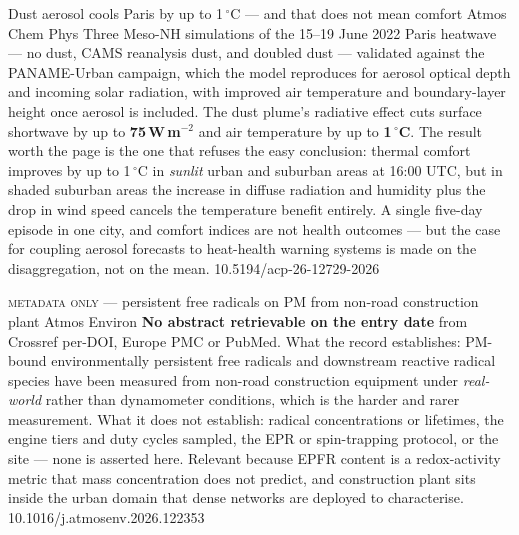 \documentclass[10pt]{article}
\begin{document}
{Dust aerosol cools Paris by up to 1\,$^{\circ}$C --- and that does not mean comfort}
{Atmos Chem Phys}
{Three Meso-NH simulations of the 15--19 June 2022 Paris heatwave --- no dust, CAMS
reanalysis dust, and doubled dust --- validated against the PANAME-Urban campaign, which
the model reproduces for aerosol optical depth and incoming solar radiation, with improved
air temperature and boundary-layer height once aerosol is included. The dust plume's
radiative effect cuts surface shortwave by up to \textbf{75\,W\,m$^{-2}$} and air
temperature by up to \textbf{1\,$^{\circ}$C}. The result worth the page is the one that
refuses the easy conclusion: thermal comfort improves by up to 1\,$^{\circ}$C in
\emph{sunlit} urban and suburban areas at 16:00 UTC, but in shaded suburban areas the
increase in diffuse radiation and humidity plus the drop in wind speed cancels the
temperature benefit entirely. A single five-day episode in one city, and comfort indices
are not health outcomes --- but the case for coupling aerosol forecasts to heat-health
warning systems is made on the disaggregation, not on the mean.}
{10.5194/acp-26-12729-2026}

{\textsc{metadata only} --- persistent free radicals on PM from non-road construction plant}
{Atmos Environ}
{\textbf{No abstract retrievable on the entry date} from Crossref per-DOI, Europe PMC or
PubMed. What the record establishes: PM-bound environmentally persistent free radicals and
downstream reactive radical species have been measured from non-road construction equipment
under \emph{real-world} rather than dynamometer conditions, which is the harder and rarer
measurement. What it does not establish: radical concentrations or lifetimes, the engine
tiers and duty cycles sampled, the EPR or spin-trapping protocol, or the site --- none is
asserted here. Relevant because EPFR content is a redox-activity metric that mass
concentration does not predict, and construction plant sits inside the urban domain that
dense networks are deployed to characterise.}
{10.1016/j.atmosenv.2026.122353}

\clearpage

\end{document}
